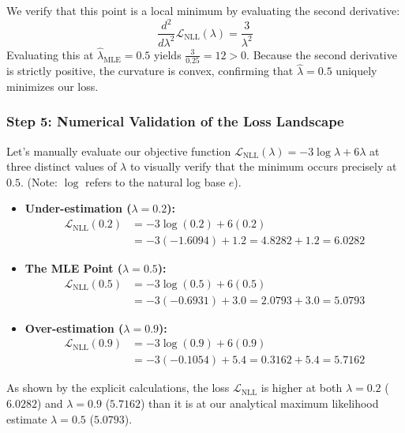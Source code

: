 \documentclass{article}
\begin{document}
We verify that this point is a local minimum by evaluating the second derivative:
\begin{equation}
\frac{d^2}{d\lambda^2} \mathcal{L}_{\text{NLL}}(\lambda) = \frac{3}{\lambda^2}
\end{equation}
Evaluating this at $\hat{\lambda}_{\text{MLE}} = 0.5$ yields $\frac{3}{0.25} = 12 > 0$. Because the second derivative is strictly positive, the curvature is convex, confirming that $\hat{\lambda} = 0.5$ uniquely minimizes our loss.

\subsubsection{Step 5: Numerical Validation of the Loss Landscape}
Let's manually evaluate our objective function $\mathcal{L}_{\text{NLL}}(\lambda) = -3\log\lambda + 6\lambda$ at three distinct values of $\lambda$ to visually verify that the minimum occurs precisely at $0.5$. (Note: $\log$ refers to the natural log base $e$).

\begin{itemize}
    \item \textbf{Under-estimation ($\lambda = 0.2$):}
    \begin{align*}
    \mathcal{L}_{\text{NLL}}(0.2) &= -3\log(0.2) + 6(0.2) \\
    &= -3(-1.6094) + 1.2 = 4.8282 + 1.2 = \mathbf{6.0282}
    \end{align*}
    
    \item \textbf{The MLE Point ($\lambda = 0.5$):}
    \begin{align*}
    \mathcal{L}_{\text{NLL}}(0.5) &= -3\log(0.5) + 6(0.5) \\
    &= -3(-0.6931) + 3.0 = 2.0793 + 3.0 = \mathbf{5.0793}
    \end{align*}
    
    \item \textbf{Over-estimation ($\lambda = 0.9$):}
    \begin{align*}
    \mathcal{L}_{\text{NLL}}(0.9) &= -3\log(0.9) + 6(0.9) \\
    &= -3(-0.1054) + 5.4 = 0.3162 + 5.4 = \mathbf{5.7162}
    \end{align*}
\end{itemize}

As shown by the explicit calculations, the loss $\mathcal{L}_{\text{NLL}}$ is higher at both $\lambda=0.2$ ($6.0282$) and $\lambda=0.9$ ($5.7162$) than it is at our analytical maximum likelihood estimate $\lambda=0.5$ ($5.0793$).
\end{document}
